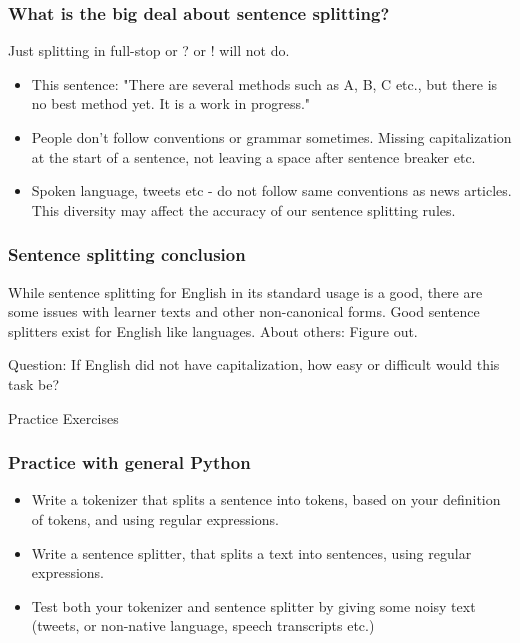 \documentclass{beamer}
\begin{document}
\begin{frame}
\frametitle{What is the big deal about sentence splitting?}
Just splitting in full-stop or ? or ! will not do.
\begin{itemize}
\item This sentence: "There are several methods such as A, B, C etc., but there is no best method yet. It is a work in progress." 
\item People don't follow conventions or grammar sometimes. Missing capitalization at the start of a sentence, not leaving a space after sentence breaker etc.
\item Spoken language, tweets etc - do not follow same conventions as news articles. This diversity may affect the accuracy of our sentence splitting rules.
\end{itemize}
\end{frame}

\begin{frame}
\frametitle{Sentence splitting conclusion}
While sentence splitting for English in its standard usage is a good, there are some issues with learner texts and other non-canonical forms. Good sentence splitters exist for English like languages. About others: Figure out. 

\bigskip Question: If English did not have capitalization, how easy or difficult would this task be? 
\end{frame}

\begin{frame}
\begin{center}
\Large Practice Exercises
\end{center}
\end{frame}

\begin{frame}
\frametitle{Practice with general Python}
\begin{itemize}
\item Write a tokenizer that splits a sentence into tokens, based on your definition of tokens, and using regular expressions.
\item Write a sentence splitter, that splits a text into sentences, using regular expressions.
\item Test both your tokenizer and sentence splitter by giving some noisy text (tweets, or non-native language, speech transcripts etc.)
\end{itemize}
\end{frame}
\end{document}
